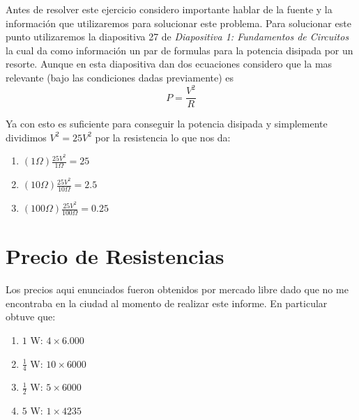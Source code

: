 \documentclass[a4paper, amsfonts, amssymb, amsmath, reprint, showkeys, nofootinbib, twoside]{revtex4-1}
\begin{document}
Antes de resolver este ejercicio considero importante hablar de la fuente y la información que utilizaremos para solucionar este problema. Para solucionar este punto utilizaremos la diapositiva 27 de \textit{Diapositiva 1: Fundamentos de Circuitos} la cual da como información un par de formulas para la potencia disipada por un resorte. Aunque en esta diapositiva dan dos ecuaciones considero que la mas relevante (bajo las condiciones dadas previamente) es
\begin{equation}
  P = \frac{V^2}{R} \label{Pr}
\end{equation}

Ya con esto es suficiente para conseguir la potencia disipada y simplemente dividimos $V^2=25V^2$ por la resistencia lo que nos da:
\begin{enumerate}
  \item $\left( 1\Omega \right) \frac{25V^2}{1\Omega}=25$
  \item $\left( 10\Omega \right) \frac{25V^2}{10\Omega}=2.5$ 
  \item $\left( 100\Omega \right) \frac{25V^2}{100\Omega}=0.25$
\end{enumerate}

\section{Precio de Resistencias}

Los precios aqui enunciados fueron obtenidos por mercado libre dado que no me encontraba en la ciudad al momento de realizar este informe. En particular obtuve que:
\begin{enumerate}
  \item $1$ W: $4\times 6.000$ 
  \item $\frac{1}{4}$ W: $10\times 6000$ 
  \item $\frac{1}{2}$ W: $5\times 6000$
  \item $5$ W: $1\times 4235$
\end{enumerate}


\end{document}

